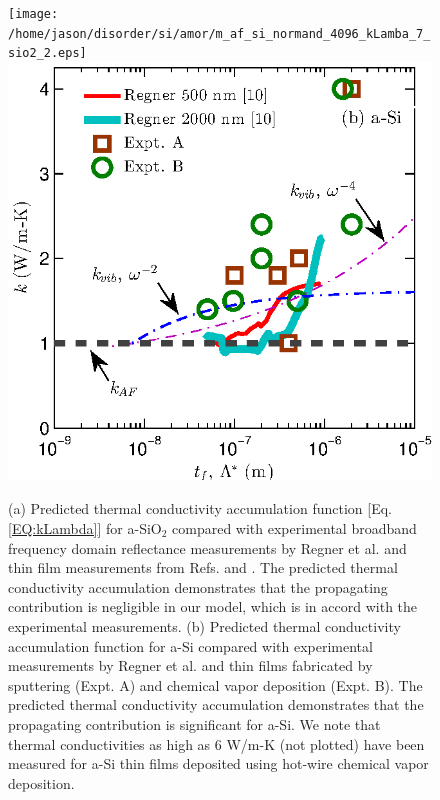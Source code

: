 \documentclass[aps,prb,onecolumn,preprint,superscriptaddress,footinbib,amsmath,amssymb,floatfix]{revtex4}
\begin{document}
\begin{figure}
\begin{center}
\texttt{[image: /home/jason/disorder/si/amor/m\_af\_si\_normand\_4096\_kLamba\_7\_sio2\_2.eps]}
\includegraphics[scale=1.0]
{fig7b.eps}
\vspace*{-5mm}
\end{center}
\caption{\label{FIG:sio2_accum} 
{\scriptsize
(a) Predicted thermal conductivity 
accumulation function [Eq. \eqref{EQ:kLambda}]  
for a-SiO$_2$ compared with experimental broadband frequency 
domain reflectance measurements 
by Regner et al.\cite{regner_broadband_2013} and thin film 
measurements from Refs.  and 
. 
The predicted thermal conductivity accumulation demonstrates that 
the propagating contribution is negligible in our model, which is 
in accord with the experimental measurements. 
(b) Predicted thermal conductivity 
accumulation function 
for a-Si compared with experimental measurements 
by Regner et al. and thin films fabricated by    
sputtering (Expt. A)
\cite{kuo_thermal_1992,wada_thermal_1996,cahill_thermal_1994} 
and chemical vapor deposition (Expt. B).
\cite{hasselman_thermal_1989,moon_thermal_2002,liu_high_2009,
yang_anomalously_2010} 
The predicted thermal conductivity accumulation demonstrates that 
the propagating contribution is significant for a-Si. 
We note that thermal conductivities as high as 6 W/m-K (not plotted) 
have been measured for a-Si thin films deposited using 
hot-wire chemical vapor deposition.
\cite{yang_anomalously_2010}}}
\end{figure}
\end{document}

